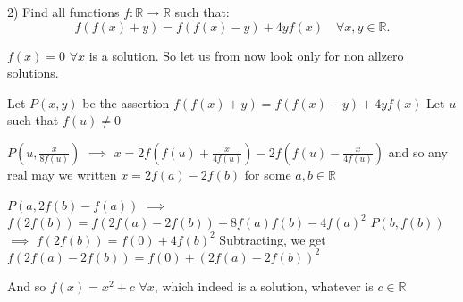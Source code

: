 \begin{solution}
	\begin{tcolorbox}2) Find all  functions $f:\mathbb{R}\to \mathbb{R}$ such that:
\[f(f(x)+y)=f(f(x)-y)+4yf(x)\quad  \forall x,y \in \mathbb{R}.\]\end{tcolorbox}
$\boxed{f(x)=0}$ $\forall x$ is a solution. So let us from now look only for non allzero solutions.

Let $P(x,y)$ be the assertion $f(f(x)+y)=f(f(x)-y)+4yf(x)$
Let $u$ such that $f(u)\ne 0$

$P(u,\frac x{8f(u)})$ $\implies$ $x=2f(f(u)+\frac x{4f(u)})-2f(f(u)-\frac x{4f(u)})$ and so any real may we written $x=2f(a)-2f(b)$ for some $a,b\in\mathbb R$

$P(a,2f(b)-f(a))$ $\implies$ $f(2f(b))=f(2f(a)-2f(b))+8f(a)f(b)-4f(a)^2$
$P(b,f(b))$ $\implies$ $f(2f(b))=f(0)+4f(b)^2$
Subtracting, we get $f(2f(a)-2f(b))=f(0)+(2f(a)-2f(b))^2$

And so $\boxed{f(x)=x^2+c}$ $\forall x$, which indeed is a solution, whatever is $c\in\mathbb R$
\end{solution}



